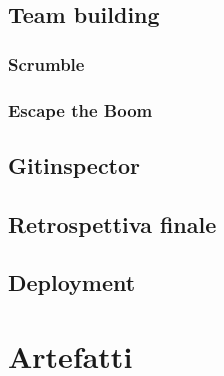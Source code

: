 \documentclass[11pt]{article}
\begin{document}
\subsection{Team building}
\subsubsection{Scrumble}
\subsubsection{Escape the Boom}

\subsection{Gitinspector}

\subsection{Retrospettiva finale}

\subsection{Deployment}


\newpage
\section{Artefatti}
\end{document}
